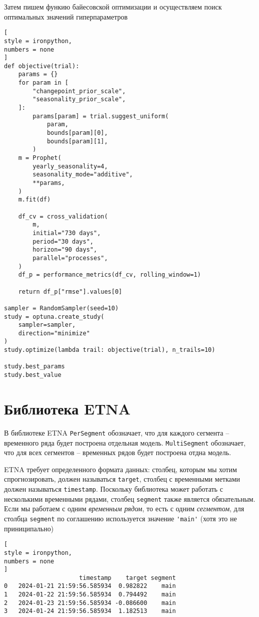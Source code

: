 \documentclass[%
	11pt,
	a4paper,
	utf8,
		]{article}
\begin{document}
Затем пишем функию байесовской оптимизации и осуществляем поиск оптимальных значений гиперпараметров
\begin{lstlisting}[
style = ironpython,
numbers = none	
]
def objective(trial):
    params = {}
    for param in [
        "changepoint_prior_scale",
        "seasonality_prior_scale",
    ]:
	    params[param] = trial.suggest_uniform(
	        param,
	        bounds[param][0],
	        bounds[param][1],
	    )
	m = Prophet(
	    yearly_seasonality=4,
	    seasonality_mode="additive",
	    **params,
	)
	m.fit(df)
	
	df_cv = cross_validation(
	    m,
	    initial="730 days",
	    period="30 days",
	    horizon="90 days",
	    parallel="processes",
	)
	df_p = performance_metrics(df_cv, rolling_window=1)
	
	return df_p["rmse"].values[0]
    
sampler = RandomSampler(seed=10)
study = optuna.create_study(
    sampler=sampler,
    direction="minimize"
)
study.optimize(lambda trail: objective(trial), n_trails=10)

study.best_params
study.best_value
\end{lstlisting}

\section{Библиотека ETNA}

В библиотеке ETNA \verb|PerSegment| обозначает, что для каждого сегмента -- временного ряда будет построена отдельная модель. \verb|MultiSegment| обозначает, что для всех сегментов -- временных рядов будет построена отдна модель.

ETNA требует определенного формата данных: столбец, которым мы хотим спрогнозировать, должен называться \verb|target|, столбец с временными метками должен называться \verb|timestamp|. Поскольку библиотека может работать с несколькими временными рядами, столбец \verb|segment| также является обязательным. Если мы работаем с одним \emph{временным рядом}, то есть с одним \emph{сегментом}, для столбца \verb|segment| по соглашению используется значение \verb|'main'| (хотя это не приниципально) \cite[]{gruzdev:time-series-2022}
\begin{lstlisting}[
style = ironpython,
numbers = none
]
                     timestamp    target segment
0   2024-01-21 21:59:56.585934  0.982822    main
1   2024-01-22 21:59:56.585934  0.794492    main
2   2024-01-23 21:59:56.585934 -0.086600    main
3   2024-01-24 21:59:56.585934  1.182513    main
\end{lstlisting}
\end{document}
